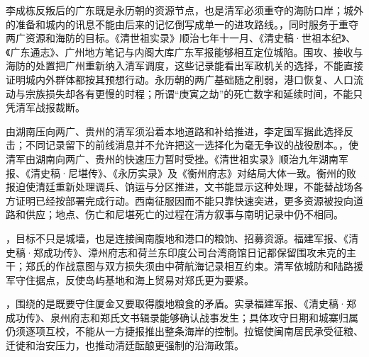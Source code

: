\begin{event}
李成栋反叛后的广东既是永历朝的资源节点，也是清军必须重夺的海防口岸；城外的准备和城内的讯息不能由后来的记忆倒写成单一的进攻路线。，同时服务于重夺两广资源和海防的目标。《清世祖实录》顺治七年十一月、《清史稿·世祖本纪》、《广东通志》、广州地方笔记与内阁大库广东军报能够相互定位城陷。围攻、接收与海防的处置把广州重新纳入清军调度，这些记录能看出军政机关的选择，不能直接证明城内外群体都按其预想行动。永历朝的两广基础随之削弱，港口恢复、人口流动与宗族损失却各有更慢的时程；所谓“庚寅之劫”的死亡数字和延续时间，不能只凭清军战报裁断。
\end{event}

\begin{event}
由湖南压向两广、贵州的清军须沿着本地道路和补给推进，李定国军据此选择反击；不同记录留下的前线消息并不允许把这一选择化为毫无争议的战役剧本。，使清军由湖南向两广、贵州的快速压力暂时受挫。《清世祖实录》顺治九年湖南军报、《清史稿·尼堪传》、《永历实录》及《衡州府志》对结局大体一致。衡州的败报迫使清廷重新处理调兵、饷运与分区推进，文书能显示这种处理，不能替战场各方证明已经按部署完成行动。西南征服因而不能只靠快速突进，更多资源被投向道路和供应；地点、伤亡和尼堪死亡的过程在清方叙事与南明记录中仍不相同。
\end{event}

\begin{event}
，目标不只是城墙，也是连接闽南腹地和港口的粮饷、招募资源。福建军报、《清史稿·郑成功传》、漳州府志和荷兰东印度公司台湾商馆日记都保留围攻未克的主干；郑氏的作战意图与双方损失须由中荷航海记录相互约束。清军依城防和陆路援军守住据点，反使岛屿基地和海上贸易对郑氏更为要紧。
\end{event}

\begin{event}
，围绕的是既要守住厦金又要取得腹地粮食的矛盾。实录福建军报、《清史稿·郑成功传》、泉州府志和郑氏文书辑录能够确认战事发生；具体攻守日期和城寨归属仍须逐项互校，不能从一方捷报推出整条海岸的控制。拉锯使闽南居民承受征粮、迁徙和治安压力，也推动清廷酝酿更强制的沿海政策。
\end{event}

